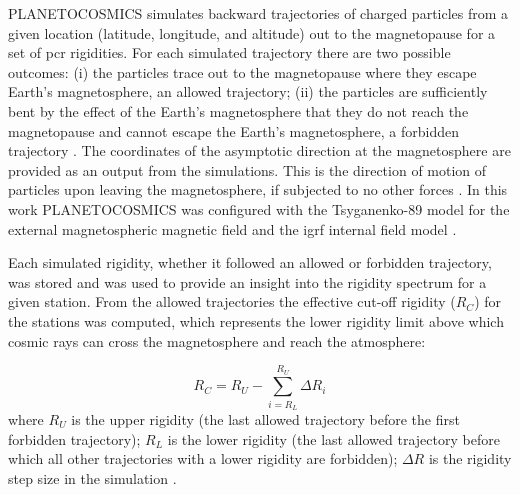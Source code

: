 PLANETOCOSMICS simulates backward trajectories of charged particles from a given location (latitude, longitude, and altitude) out to the magnetopause for a set of \gls{pcr} rigidities. For each simulated trajectory there are two possible outcomes: (i) the particles trace out to the magnetopause where they escape Earth's magnetosphere, an allowed trajectory; (ii) the particles are sufficiently bent by the effect of the Earth's magnetosphere that they do not reach the magnetopause and cannot escape the Earth's magnetosphere, a forbidden trajectory \citep{shea_study_1965, desorgher_planetocosmics_2005, desorgher_planetocosmics_2006}. The coordinates of the asymptotic direction at the magnetosphere are provided as an output from the simulations. This is the direction of motion of particles upon leaving the magnetosphere, if subjected to no other forces \citep{shea_study_1965, desorgher_planetocosmics_2006, danilova_mapping_2019}. In this work PLANETOCOSMICS was configured with the Tsyganenko-89 model for the external magnetospheric magnetic field \citep{tsyganenko_magnetospheric_1989, tsyganenko_data-based_2013} and the \gls{igrf} internal field model \citep{thebault_international_2015}.

Each simulated rigidity, whether it followed an allowed or forbidden trajectory, was stored and was used to provide an insight into the rigidity spectrum for a given station. From the allowed trajectories the effective cut-off rigidity ($R_C$) for the stations was computed, which represents the lower rigidity limit above which cosmic rays can cross the magnetosphere and reach the atmosphere:

\begin{equation}
\label{eq:cut_off}
R_C = R_U - \sum_{i = R_L}^{R_U} \Delta R_i
\end{equation}
%
where $R_U$ is the upper rigidity (the last allowed trajectory before the first forbidden trajectory); $R_L$ is the lower rigidity (the last allowed trajectory before which all other trajectories with a lower rigidity are forbidden); $\Delta R$ is the rigidity step size in the simulation \citep{shea_study_1965, desorgher_planetocosmics_2005, desorgher_planetocosmics_2006, herbst_influence_2013}.


